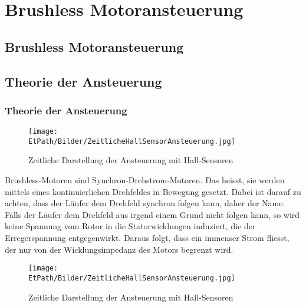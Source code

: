 \ifSTANDALONE
\section{Brushless Motoransteuerung}
\fi
\ifEMBED
\subsection{Brushless Motoransteuerung}
\fi

\ifEMBED
    \BLDCcollab
\fi
    \ifSTANDALONE
    \subsection{Theorie der Ansteuerung}
    \fi
    \ifEMBED
    \subsubsection{Theorie der Ansteuerung}
    \fi
    \ifEMBED
        \begin{wrapfigure}{r}{0.50\textwidth}
           	\texttt{[image: \\EtPath/Bilder/ZeitlicheHallSensorAnsteuerung.jpg]}
           	\caption[Zeitliche Darstellung der Ansteuerung mit 
                Hall-Sensoren]{Zeitliche Darstellung der Ansteuerung mit 
                Hall-Sensoren \cite{AppNote:BrushlessuC}}
           	\centering
            \label{abb:ZeitlicheAnsteuerungBrushlessMotor}
        \end{wrapfigure}
    \fi
        Brushless-Motoren sind Synchron-Drehstrom-Motoren. Das heisst, sie 
        werden mittels eines kontinuierlichen Drehfeldes in Bewegung gesetzt. 
        Dabei ist darauf zu achten, dass der Läufer dem Drehfeld synchron 
        folgen kann, daher der Name. Falls der Läufer dem Drehfeld aus irgend 
        einem Grund nicht folgen kann, so wird keine Spannung vom Rotor in die 
        Statorwicklungen induziert, die der Erregerspannung entgegenwirkt. 
        Daraus folgt, dass ein immenser Strom fliesst, der nur von der 
        Wicklungsimpedanz des Motors begrenzt wird.\\
        \ifSTANDALONE
           \begin{figure}[h!]
               \centering
               \texttt{[image: \\EtPath/Bilder/ZeitlicheHallSensorAnsteuerung.jpg]}
               \caption[Zeitliche Darstellung der Ansteuerung mit 
                   Hall-Sensoren]{Zeitliche Darstellung der Ansteuerung mit 
                   Hall-Sensoren \cite{AppNote:BrushlessuC}}
              	\centering
               \label{abb:ZeitlicheAnsteuerungBrushlessMotor}
           \end{figure}
